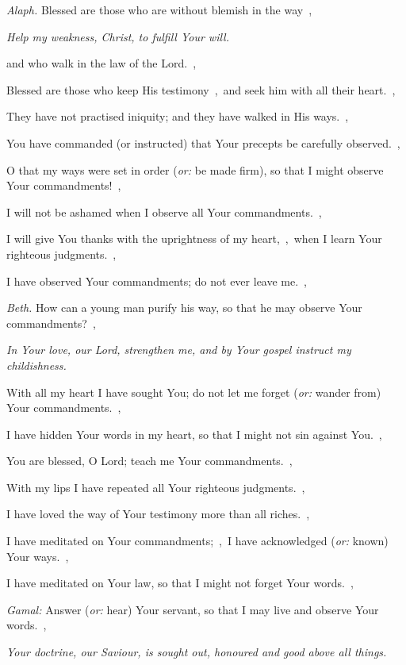 \documentclass[12pt,twoside,a5paper]{article}
\newcommand{\qanona}[1]{{\liturgicalhint{Qanona.} \emph{#1}}}
\newcommand{\translationoption}[1]{\emph{or:} #1}
\begin{document}
\begin{normalparskip}
  \emph{Alaph.} Blessed are those who are without blemish in the way~\sep

  \qanona{Help my weakness, Christ, to fulfill Your will.}

  and who walk in the law of the Lord.~\sep

  Blessed are those who keep His testimony~\sep\ and seek him with all their heart.~\sep

  They have not practised iniquity; and they have walked in His ways.~\sep

  You have commanded (or instructed) that Your precepts be carefully observed.~\sep

  O that my ways were set in order (\translationoption{be made firm}), so that I might observe Your commandments!~\sep

  I will not be ashamed when I observe all Your commandments.~\sep

  I will give You thanks with the uprightness of my heart,~\sep\ when I learn Your righteous judgments.~\sep

  I have observed Your commandments; do not ever leave me.~\sep

  \emph{Beth.} How can a young man purify his way, so that he may observe Your commandments?~\sep

  \qanona{In Your love, our Lord, strengthen me, and by Your gospel instruct my childishness.}

  With all my heart I have sought You; do not let me forget (\translationoption{wander from}) Your commandments.~\sep

  I have hidden Your words in my heart, so that I might not sin against You.~\sep

  You are blessed, O Lord; teach me Your commandments.~\sep

  With my lips I have repeated all Your righteous judgments.~\sep

  I have loved the way of Your testimony more than all riches.~\sep

  I have meditated on Your commandments;~\sep\ I have acknowledged (\translationoption{known}) Your ways.~\sep

  I have meditated on Your law, so that I might not forget Your words.~\sep

  \emph{Gamal:} Answer (\translationoption{hear}) Your servant, so that I may live and observe Your words.~\sep

  \qanona{Your doctrine, our Saviour, is sought out, honoured and good above all things.}


\end{normalparskip}
\end{document}
